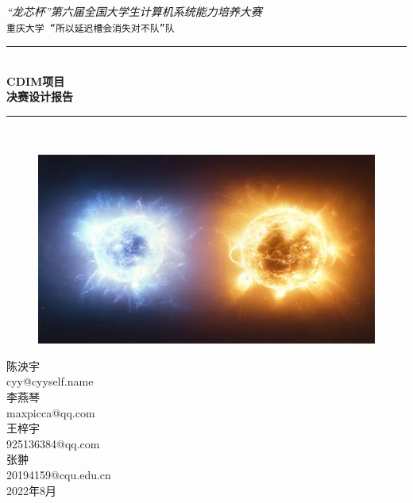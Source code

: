 \documentclass[black,normal,cn,hide]{elegantbook}
\newcommand{\artdate}{2022年8月}
\newcommand{\cpuname}{CDIM}
\newcommand{\hlrule}{\rule{\linewidth}{0.5mm}}
\begin{document}
\begin{titlepage}
    \vfill
    \center 
    \textit{\Large “龙芯杯”第六届全国大学生计算机系统能力培养大赛}\\[0.5cm] 
    \texttt{\Large 重庆大学 “所以延迟槽会消失对不队”队}
  
    \vspace{1.5 cm}
    \hlrule \\[0.4 cm]
    { \huge \bfseries \cpuname 项目}\\[0.4cm]
    { \huge \bfseries 决赛设计报告}\\
    \hlrule \\[1cm]
   
    \begin{figure}[h]
      \centering
      \includegraphics[width=0.5\linewidth]{logo.png}
    \end{figure}
   \vspace{0.5 cm}
  
    \vspace{.5 cm}
    陈泱宇\\
    cyy@cyyself.name\\
    \vspace{.5 cm}
    李燕琴\\
    maxpicca@qq.com\\
    \vspace{.5 cm}
    王梓宇\\
    925136384@qq.com\\
    \vspace{.5 cm}
    张翀\\
    20194159@cqu.edu.cn\\
  
    \vspace{2 cm}
    {\large \artdate}\\[3cm] 
  
  \vfill
  
\end{titlepage}

\tableofcontents
\mainmatter




\end{document}
